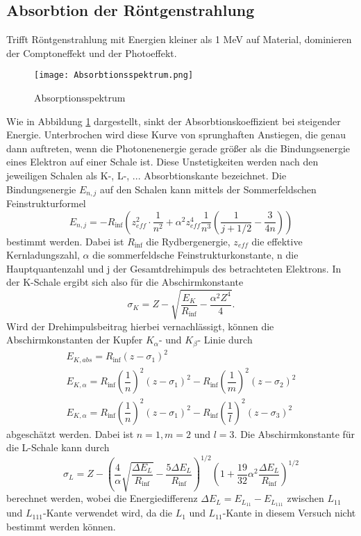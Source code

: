 \subsection{Absorbtion der Röntgenstrahlung}
    Trifft Röntgenstrahlung mit Energien kleiner als 1 MeV auf Material, 
    dominieren der Comptoneffekt und der Photoeffekt.
    \begin{figure}
        \centering
        \texttt{[image: Absorbtionsspektrum.png]}
        \caption{Absorptionsspektrum \cite{anleitung}}
        \label{fig:rechtschreifehler}
      \end{figure}
    Wie in Abbildung \ref{fig:rechtschreifehler} dargestellt, sinkt der Absorbtionskoeffizient bei steigender Energie.
    Unterbrochen wird diese Kurve von sprunghaften Anstiegen, die genau dann auftreten, wenn 
    die Photonenenergie gerade größer als die Bindungsenergie eines Elektron auf einer Schale ist.
    Diese Unstetigkeiten werden nach den jeweiligen Schalen als K-, L-, ... Absorbtionskante
    bezeichnet. Die Bindungsenergie $E_{n,j}$ auf den Schalen kann mittels der 
    Sommerfeldschen Feinstrukturformel
    \begin{equation}
        E_{n, j}=-R_{\inf}(z_{eff}^2 \cdot \dfrac{1}{n^2} + \alpha^2z_{eff}^4 \dfrac{1}{n^3}
        (\dfrac{1}{j+1/2}-\dfrac{3}{4n}))
    \end{equation}
    bestimmt werden. Dabei ist $R_{\inf}$ die Rydbergenergie, $z_{eff}$ die effektive
    Kernladungszahl, $\alpha$ die sommerfeldsche Feinstrukturkonstante, n die Hauptquantenzahl
    und j der Gesamtdrehimpuls des betrachteten Elektrons. In der K-Schale ergibt sich also
    für die Abschirmkonstante 
    \begin{equation}
        \sigma_K = Z - \sqrt{\dfrac{E_K}{R_{\inf}}-\dfrac{\alpha^2 Z^4}{4}}.
        \label{eqn:sigma}
    \end{equation}
    Wird der Drehimpulsbeitrag hierbei vernachlässigt, können die Abschirmkonstanten der Kupfer
    $K_{\alpha}$- und $K_{\beta}$- Linie durch 
    \begin{align}
        E_{K, abs}=R_{\inf} (z-\sigma_1)^2\\
        E_{K, \alpha}=R_{\inf} (\dfrac{1}{n})^2 (z-\sigma_1)^2 - R_{\inf} (\dfrac{1}{m})^2 (z-\sigma_2)^2 \\
        \label{eqn:nikolaaaaaaa}
        E_{K, \alpha}=R_{\inf} (\dfrac{1}{n})^2 (z-\sigma_1)^2 - R_{\inf} (\dfrac{1}{l})^2 (z-\sigma_3)^2
    \end{align}
    abgeschätzt werden. Dabei ist $n=1, m=2$ und $l=3$.
    Die Abschirmkonstante für die L-Schale kann durch 
    \begin{equation}
        \sigma_L=Z-(\dfrac{4}{\alpha} \sqrt{\dfrac{\Delta E_L}{R_{\inf}}}-\dfrac{5 \Delta E_L}
        {R_{\inf}})^{1/2} (1+\dfrac{19}{32}\alpha^2 \dfrac{\Delta E_L}{R_{\inf}})^{1/2}
    \end{equation}
    berechnet werden, wobei die Energiedifferenz $\Delta E_L = E_{L_{11}} - E_{L_{111}}$ zwischen 
    $L_{11}$ und $L_{111}$-Kante verwendet wird, da die $L_1$ und $L_{11}$-Kante in diesem
    Versuch nicht bestimmt werden können.

